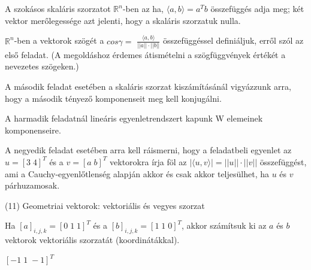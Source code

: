 \begin{frame}
  \begin{tcolorbox}[title={Megoldások {\symking}}]
    A szokásos skaláris szorzatot $\mathbb{R}^n$-ben az ha, ${\langle}a, b{\rangle} = a^Tb$ összefüggés adja meg; két vektor merőlegessége azt jelenti, hogy a skaláris szorzatuk nulla.\\
    \mmedskip
    
    $\mathbb{R}^n$-ben a vektorok szögét a $cos{\gamma} =$ $\frac{{\langle}a, b{\rangle}}{||a|| \cdot ||b||}$ összefüggéssel definiáljuk, erről szól az első feladat. (A megoldáshoz érdemes átismételni a szögfüggvények értékét a nevezetes szögeken.)\\
    \mmedskip
    
    A második feladat esetében a skaláris szorzat kiszámításánál vigyázzunk arra, hogy a második tényező komponenseit meg kell konjugálni.\\
    \mmedskip
    
    A harmadik feladatnál lineáris egyenletrendszert kapunk W elemeinek komponenseire.\\
    \mmedskip
    
    A negyedik feladat esetében arra kell ráismerni, hogy a feladatbeli egyenlet az $u = [3 \; 4]^T$ és a $v = [a \; b]^T$ vektorokra írja föl az  $|{\langle}u, v{\rangle}| = ||u|| \cdot ||v||$ összefüggést, ami a Cauchy-egyenlőtlenség alapján akkor és csak akkor teljesülhet, ha $u$ és $v$ párhuzamosak.
  \end{tcolorbox}
\end{frame}


\begin{frame}[plain]
\begin{tcolorbox}[center, colback={myyellow}, coltext={black}, colframe={myyellow}]
    {\RHuge  (11) Geometriai vektorok: vektoriális és vegyes szorzat }
    \mmedskip
\end{tcolorbox}
\end{frame}

\begin{frame}
  \begin{tcolorbox}[title={11/1. {\symknight}}]
    Ha $[a]_{i,j,k} = [0 \; 1 \; 1]^T$ és a $[b]_{i,j,k} = [1 \; 1 \; 0]^T$, akkor számítsuk ki az $a$ és $b$ vektorok vektoriális szorzatát (koordinátákkal).

  \tcblower

    \mmedskip 
    
    $[-1 \; 1 \; -1]^T$
  \end{tcolorbox}
\end{frame}


